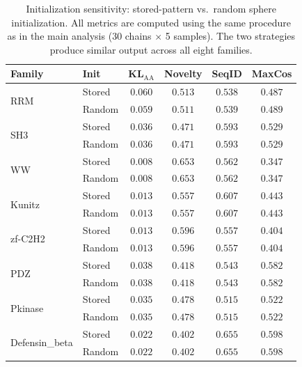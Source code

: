 \documentclass[10pt]{article}
\begin{document}
\begin{table}[ht]
\centering
\caption{Initialization sensitivity: stored-pattern vs.\ random sphere initialization. All metrics are computed using the same procedure as in the main analysis (30 chains $\times$ 5 samples). The two strategies produce similar output across all eight families.}
\label{tab:random-init}
\small
\begin{tabular}{@{}llcccc@{}}
\toprule
Family & Init & KL$_{\mathrm{AA}}$ & Novelty & SeqID & MaxCos \\
\midrule
\multirow{2}{*}{RRM}
 & Stored & $0.060$ & $0.513$ & $0.538$ & $0.487$ \\
 & Random & $0.059$ & $0.511$ & $0.539$ & $0.489$ \\
\midrule
\multirow{2}{*}{SH3}
 & Stored & $0.036$ & $0.471$ & $0.593$ & $0.529$ \\
 & Random & $0.036$ & $0.471$ & $0.593$ & $0.529$ \\
\midrule
\multirow{2}{*}{WW}
 & Stored & $0.008$ & $0.653$ & $0.562$ & $0.347$ \\
 & Random & $0.008$ & $0.653$ & $0.562$ & $0.347$ \\
\midrule
\multirow{2}{*}{Kunitz}
 & Stored & $0.013$ & $0.557$ & $0.607$ & $0.443$ \\
 & Random & $0.013$ & $0.557$ & $0.607$ & $0.443$ \\
\midrule
\multirow{2}{*}{zf-C2H2}
 & Stored & $0.013$ & $0.596$ & $0.557$ & $0.404$ \\
 & Random & $0.013$ & $0.596$ & $0.557$ & $0.404$ \\
\midrule
\multirow{2}{*}{PDZ}
 & Stored & $0.038$ & $0.418$ & $0.543$ & $0.582$ \\
 & Random & $0.038$ & $0.418$ & $0.543$ & $0.582$ \\
\midrule
\multirow{2}{*}{Pkinase}
 & Stored & $0.035$ & $0.478$ & $0.515$ & $0.522$ \\
 & Random & $0.035$ & $0.478$ & $0.515$ & $0.522$ \\
\midrule
\multirow{2}{*}{Defensin\_beta}
 & Stored & $0.022$ & $0.402$ & $0.655$ & $0.598$ \\
 & Random & $0.022$ & $0.402$ & $0.655$ & $0.598$ \\
\bottomrule
\end{tabular}
\end{table}

\end{document}
